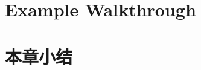 \section{Example Walkthrough}













\section{本章小结}





















































